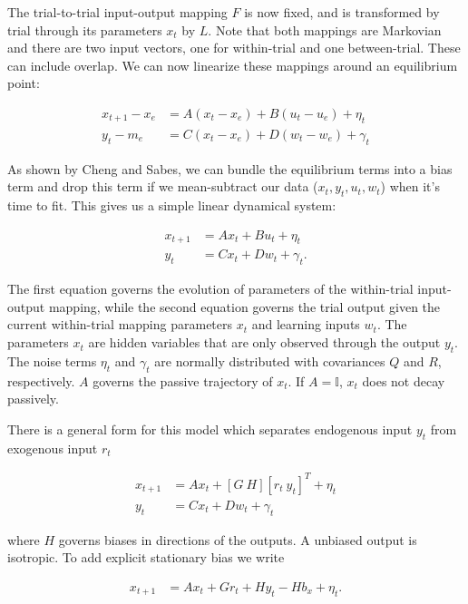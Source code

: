 \documentclass[../main.tex]{subfiles}
\begin{document}
The trial-to-trial input-output mapping \(F\) is now fixed, and is
transformed by trial through its parameters \(x_t\) by \(L\). Note that
both mappings are Markovian and there are two input vectors, one for
within-trial and one between-trial. These can include overlap. We can
now linearize these mappings around an equilibrium point:

\[
\begin{aligned}
x_{t+1} - x_e &= A(x_t-x_e) + B(u_t-u_e) + \eta_t \\
y_t - m_e &= C(x_t-x_e) + D(w_t-w_e) + \gamma_t
\end{aligned}
\]

As shown by Cheng and Sabes, we can bundle the equilibrium terms into a
bias term and drop this term if we mean-subtract our data
(\(x_t, y_t, u_t, w_t\)) when it's time to fit. This gives us a simple
linear dynamical system:

\[
\begin{aligned}
x_{t+1} &= Ax_t + Bu_t + \eta_t \\
y_t &= Cx_t + Dw_t + \gamma_t.
\end{aligned}
\]

The first equation governs the evolution of parameters of the
within-trial input-output mapping, while the second equation governs the
trial output given the current within-trial mapping parameters \(x_t\)
and learning inputs \(w_t\). The parameters \(x_t\) are hidden variables
that are only observed through the output \(y_t\). The noise terms
\(\eta_t\) and \(\gamma_t\) are normally distributed with covariances
\(Q\) and \(R\), respectively. \(A\) governs the passive trajectory of
\(x_t\). If \(A=\mathbb{I}\), \(x_t\) does not decay passively.

There is a general form for this model which separates endogenous input
\(y_t\) from exogenous input \(r_t\)

\[
\begin{aligned}
x_{t+1} &= Ax_t + [G \ H][r_t \ y_t]^T + \eta_t \\
y_t &= Cx_t + Dw_t + \gamma_t
\end{aligned}
\]

where \(H\) governs biases in directions of the outputs. A unbiased
output is isotropic. To add explicit stationary bias we write

\[
\begin{aligned}
x_{t+1} &= Ax_t + Gr_t + Hy_t - Hb_x + \eta_t.
\end{aligned}
\]
\end{document}
